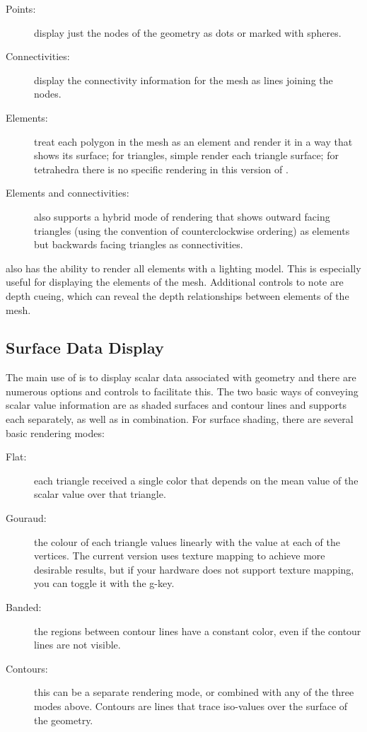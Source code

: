 \begin{description}
  \item [Points: ] display just the nodes of the geometry as dots or marked
        with spheres.
  \item [Connectivities: ] display the connectivity information for the
        mesh as lines joining the nodes.
  \item [Elements: ] treat each polygon in the mesh as an element and
        render it in a way that shows its surface; for triangles, simple
        render each triangle surface; for tetrahedra there is no specific
        rendering in this version of \map{}.
  \item [Elements and connectivities: ] \map{} also supports a hybrid mode
        of rendering that shows outward facing triangles (using the
        convention of counterclockwise ordering) as elements but backwards
        facing triangles as connectivities.
\end{description}

\map{} also has the ability to render
all elements with a lighting model.  This is especially useful for
displaying the elements of the mesh.  Additional controls to note are depth
cueing, which can reveal the depth relationships between elements of the
mesh. 


\subsection{Surface Data Display} 
\label{sec:display-data} 

The main use of \map{} is to display scalar data associated with geometry
and there are numerous options and controls to facilitate this.  The two
basic ways of conveying scalar value information are as shaded surfaces
and contour lines and \map{} supports each separately, as well as in
combination.  For surface shading, there are several basic rendering modes:

\begin{description}
  \item [Flat: ] each triangle received a single color that depends on the
        mean value of the scalar value over that triangle.
  \item [Gouraud: ] the colour of each triangle values linearly with the
        value at each of the vertices.  The current version uses texture
        mapping to achieve more desirable results, but if your hardware
        does not support texture mapping, you can toggle it with the g-key.
  \item [Banded: ] the regions between contour lines have a constant color,
        even if the contour lines are not visible.
  \item [Contours: ] this can be a separate rendering mode, or combined
        with any of the three modes above.  Contours are lines that trace
        iso-values over the surface of the geometry.
\end{description}


